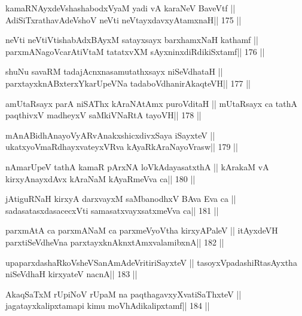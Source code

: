 \begin{shl}
kamaRNAyxdeVshashabodxV\s yaM yadi vA karaNeV BaveVtf ||
AdiSiTxrathavA\s\s deVshoV neVti neVtayxdavxyAtamxnaH\hfill || 175 ||
\end{shl}

\begin{shl}
neVti neVtiVtishabAdxBAyxM satayxsayx barxhamxNaH kathamf ||
parxmANagoVcarAtiVtaM tatatxvXM sAyxninxdiRdikiSxtamf\hfill || 176 ||
\end{shl}

\begin{shl}
shuNu savaRM tadajAcnxnasamutathxsayx niSeVdhataH ||
parxtayxknABxterxYkarUpeVNa tadaboVdhanirAkaqteVH\hfill || 177 ||
\end{shl}

\begin{shl}
amUtaRsayx parA niSAThx kAraNAtAmx puroVditaH ||
mUtaRsayx ca tathA paqthivxV madheyxV saMkiVNaRtA tayoVH\hfill || 178 ||
\end{shl}

\begin{shl}
mAnABidhAnayoVyARvAnakxshicxdivxSaya iSayxteV ||
ukatxyoVmaRdhayxvateyxVRva kAyaRkAraNayoVrasw\hfill || 179 ||
\end{shl}

\begin{shl}
nAmarUpeV tathA kamaR pArxNA loVkAdayasatxthA ||
kArakaM vA kirxyA\s nayxdAvx kAraNaM kAyaRmeVva ca\hfill || 180 ||
\end{shl}

\begin{shl}
jAtiguRNaH kirxyA darxvayxM saMbanodhxV BAva Eva ca ||
sadasatasxdasacecxVti samasatxvayxsatxmeVva ca\hfill || 181 ||
\end{shl}

\begin{shl}
parxmAtA ca parxmANaM ca parxmeVyoV\s tha kirxyAPaleV ||
itAyxdeVH parxtiSeVdheVna parxtayxknAknxtAmxvalamibxnA\hfill || 182 ||
\end{shl}

\begin{shl}
upaparxdashaRkoV\s sheVSanAmAdeVritiriSayxteV ||
tasoyxVpadashiRtasAyxtha niSeVdhaH kirxyateV nacnA\hfill || 183 ||
\end{shl}

\begin{shl}
AkaqSaTxM rUpiNoV rUpaM na paqthagavxyXvatiSaThxteV ||
jagatayxkalipxtamapi kimu moVhAdikalipxtamf\hfill || 184 ||
\end{shl}

